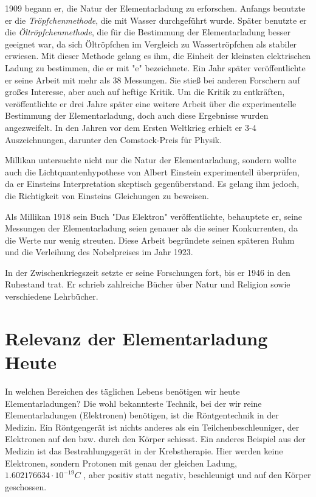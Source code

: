 1909 begann er, die Natur der Elementarladung zu erforschen. Anfangs benutzte er die \textit{Tröpfchenmethode}, die mit Wasser durchgeführt wurde. Später benutzte er die \textit{Öltröpfchenmethode}, die für die Bestimmung der Elementarladung besser geeignet war, da sich Öltröpfchen im Vergleich zu Wassertröpfchen als stabiler erwiesen.  Mit dieser Methode gelang es ihm, die Einheit der kleinsten elektrischen Ladung zu bestimmen, die er mit "e" bezeichnete. Ein Jahr später veröffentlichte er seine Arbeit mit mehr als 38 Messungen. Sie stieß bei anderen Forschern auf großes Interesse, aber auch auf heftige Kritik. Um die Kritik zu entkräften, veröffentlichte er drei Jahre später eine weitere Arbeit über die experimentelle Bestimmung der Elementarladung, doch auch diese Ergebnisse wurden angezweifelt. In den Jahren vor dem Ersten Weltkrieg erhielt er 3-4 Auszeichnungen, darunter den Comstock-Preis für Physik.

Millikan untersuchte nicht nur die Natur der Elementarladung, sondern wollte auch die Lichtquantenhypothese von Albert {\sc Einstein} experimentell überprüfen, da er Einsteins Interpretation skeptisch gegenüberstand. Es gelang ihm jedoch, die Richtigkeit von Einsteins Gleichungen zu beweisen.

Als Millikan 1918 sein Buch "Das Elektron" veröffentlichte, behauptete er, seine Messungen der Elementarladung seien genauer als die seiner Konkurrenten, da die Werte nur wenig streuten. Diese Arbeit begründete seinen späteren Ruhm und die Verleihung des Nobelpreises im Jahr 1923. 

In der Zwischenkriegszeit setzte er seine Forschungen fort, bis er 1946 in den Ruhestand trat. Er schrieb zahlreiche Bücher über Natur und Religion sowie verschiedene Lehrbücher. \parencite[vgl.][Millikan]{dewiki:247237013}

\section{Relevanz der Elementarladung Heute}\label{sec:relevanz}
In welchen Bereichen des täglichen Lebens benötigen wir heute Elementarladungen? Die wohl bekannteste Technik, bei der wir reine Elementarladungen (Elektronen) benötigen, ist die Röntgentechnik in der Medizin. Ein Röntgengerät ist nichts anderes als ein Teilchenbeschleuniger, der Elektronen auf den bzw. durch den Körper schiesst. Ein anderes Beispiel aus der Medizin ist das Bestrahlungsgerät in der Krebstherapie. Hier werden keine Elektronen, sondern Protonen mit genau der gleichen Ladung, $1.602176634 \cdot 10^{-19} C$ \parencite[123]{fundamentum_mathe}, aber positiv statt negativ, beschleunigt und auf den Körper geschossen. 

